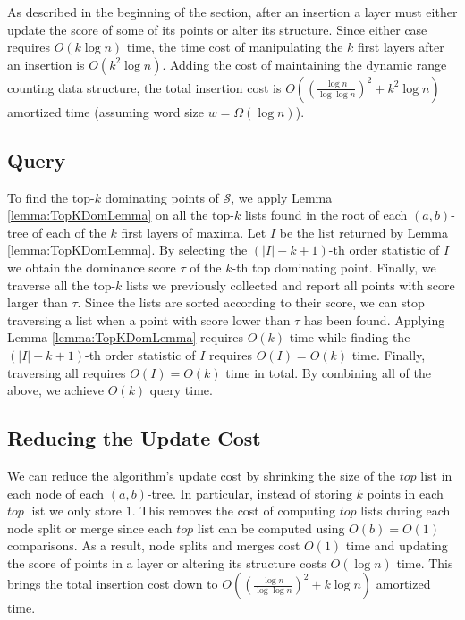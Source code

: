 \documentclass{llncs}
\begin{document}
As described in the beginning of the section, after an insertion a layer must either update the score of some of its points or alter its structure. Since either case requires $O(k\log n)$ time, the time cost of manipulating the $k$ first layers after an insertion is $O(k^{2}\log n)$. Adding the cost of maintaining the dynamic range counting data structure, the total insertion cost is $O((\frac{\log n}{\log\log n})^{2}+k^{2}\log n)$ amortized time (assuming word size $w=\Omega(\log n)$).


\subsection{Query} \label{subsection:Query}
To find the top-$k$ dominating points of $\mathcal{S}$, we apply Lemma \ref{lemma:TopKDomLemma} on all the top-$k$ lists found in the root of each $(a,b)$-tree of each of the $k$ first layers of maxima. Let $I$ be the list returned by Lemma \ref{lemma:TopKDomLemma}. By selecting the $(|I|-k+1)$-th order statistic of $I$ we obtain the dominance score $\tau$ of the $k$-th top dominating point. Finally, we traverse all the top-$k$ lists we previously collected and report all points with score larger than $\tau$. Since the lists are sorted according to their score, we can stop traversing a list when a point with score lower than $\tau$ has been found. Applying Lemma \ref{lemma:TopKDomLemma} requires $O(k)$ time while finding the $(|I|-k+1)$-th order statistic of $I$ requires $O(I)=O(k)$ time. Finally, traversing all requires $O(I)=O(k)$ time in total. By combining all of the above, we achieve $O(k)$ query time.

\subsection{Reducing the Update Cost} \label{subsection:ReduceUpdateCost}
We can reduce the algorithm's update cost by shrinking the size of the $top$ list in each node of each $(a,b)$-tree. In particular, instead of storing $k$ points in each $top$ list we only store $1$. This removes the cost of computing $top$ lists during each node split or merge since each $top$ list can be computed using $O(b)=O(1)$ comparisons. As a result, node splits and merges cost $O(1)$ time and updating the score of points in a layer or altering its structure costs $O(\log n)$ time. This brings the total insertion cost down to $O((\frac{\log n}{\log\log n})^{2}+k\log n)$ amortized time.
\end{document}
